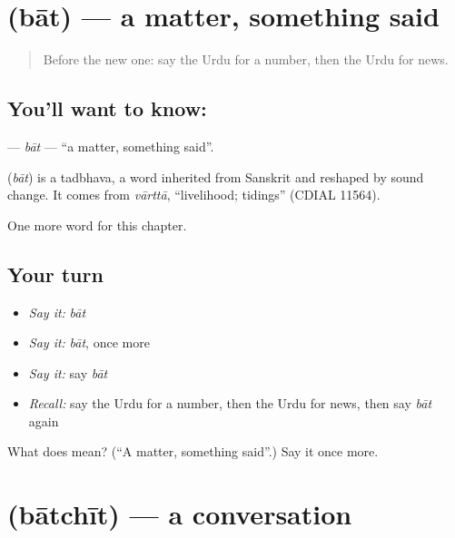 \section[\texorpdfstring{\ur{بات} (bāt)}{بات (bāt)}]{ (bāt) — a matter, something said}

\label{lesson:UR-C204-bat}



\begin{quote}
Before the new one: say the Urdu for a number, then the Urdu for news.
\end{quote}

\subsection*{You'll want to know: }
\textbf{} — \emph{bāt} — \textquotedblleft{}a matter, something said\textquotedblright{}.

\begin{cousinweb}
\textbf{} (\emph{bāt}) is a tadbhava, a word inherited from Sanskrit and reshaped by sound change. It comes from \emph{vārttā}, \textquotedblleft{}livelihood; tidings\textquotedblright{} (CDIAL 11564).
\end{cousinweb}

\begin{grammarlens}[title={What you've built}]
One more word for this chapter.
\end{grammarlens}

\subsection*{Your turn}
\begin{itemize}
\raggedright
  \item \emph{Say it:} \emph{bāt}
  \item \emph{Say it:} \emph{bāt}, once more
  \item \emph{Say it:} say \emph{bāt}
  \item \emph{Recall:} say the Urdu for a number, then the Urdu for news, then say \emph{bāt} again
\end{itemize}

\begin{tcolorbox}[breakable,colback=teal!4,colframe=teal!35!black,title={Before you move on}]
What does  mean? (\textquotedblleft{}A matter, something said\textquotedblright{}.) Say it once more.
\end{tcolorbox}
\section[\texorpdfstring{\ur{بات} \ur{چیت} (bātchīt)}{بات چیت (bātchīt)}]{  (bātchīt) — a conversation}

